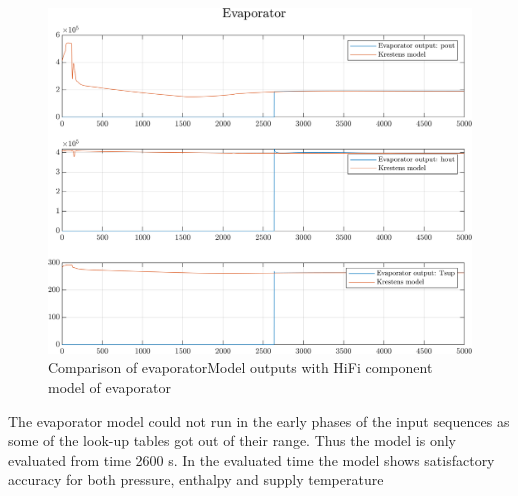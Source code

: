 \clearpage
\begin{figure}[h]
	\centering
	\includegraphics[width=1\textwidth]{Graphics/comp_test_eva.png}
	\caption{Comparison of evaporatorModel outputs with HiFi component model of evaporator}
	\label{fig:component_test_eva}
\end{figure}
The evaporator model could not run in the early phases of the input sequences as some of the look-up tables got out of their range. Thus the model is only evaluated from time 2600 s.
In the evaluated time the model shows satisfactory accuracy for both pressure, enthalpy and supply temperature



